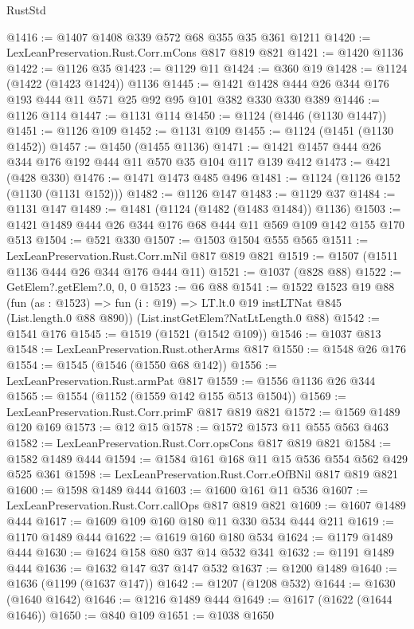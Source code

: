 \begin{lexlean}{RustStd}
\begin{coremodule}
@1416 := @1407 @1408 @339 @572 @68 @355 @35 @361 @1211
@1420 := LexLeanPreservation.Rust.Corr.mCons @817 @819 @821
@1421 := @1420 @1136
@1422 := @1126 @35
@1423 := @1129 @11
@1424 := @360 @19
@1428 := @1124 (@1422 (@1423 @1424)) @1136
@1445 := @1421 @1428 @444 @26 @344 @176 @193 @444 @11 @571 @25 @92 @95 @101 @382 @330 @330 @389
@1446 := @1126 @114
@1447 := @1131 @114
@1450 := @1124 (@1446 (@1130 @1447))
@1451 := @1126 @109
@1452 := @1131 @109
@1455 := @1124 (@1451 (@1130 @1452))
@1457 := @1450 (@1455 @1136)
@1471 := @1421 @1457 @444 @26 @344 @176 @192 @444 @11 @570 @35 @104 @117 @139 @412
@1473 := @421 (@428 @330)
@1476 := @1471 @1473 @485 @496
@1481 := @1124 (@1126 @152 (@1130 (@1131 @152)))
@1482 := @1126 @147
@1483 := @1129 @37
@1484 := @1131 @147
@1489 := @1481 (@1124 (@1482 (@1483 @1484)) @1136)
@1503 := @1421 @1489 @444 @26 @344 @176 @68 @444 @11 @569 @109 @142 @155 @170 @513
@1504 := @521 @330
@1507 := @1503 @1504 @555 @565
@1511 := LexLeanPreservation.Rust.Corr.mNil @817 @819 @821
@1519 := @1507 (@1511 @1136 @444 @26 @344 @176 @444 @11)
@1521 := @1037 (@828 @88)
@1522 := GetElem?.getElem?.{0, 0, 0}
@1523 := @6 @88
@1541 := @1522
    @1523
    @19
    @88
    (fun (as : @1523) => fun (i : @19) => LT.lt.{0} @19 instLTNat @845 (List.length.{0} @88 @890))
    (List.instGetElem?NatLtLength.{0} @88)
@1542 := @1541 @176
@1545 := @1519 (@1521 (@1542 @109))
@1546 := @1037 @813
@1548 := LexLeanPreservation.Rust.otherArms @817
@1550 := @1548 @26 @176
@1554 := @1545 (@1546 (@1550 @68 @142))
@1556 := LexLeanPreservation.Rust.armPat @817
@1559 := @1556 @1136 @26 @344
@1565 := @1554 (@1152 (@1559 @142 @155 @513 @1504))
@1569 := LexLeanPreservation.Rust.Corr.primF @817 @819 @821
@1572 := @1569 @1489 @120 @169
@1573 := @12 @15
@1578 := @1572 @1573 @11 @555 @563 @463
@1582 := LexLeanPreservation.Rust.Corr.opsCons @817 @819 @821
@1584 := @1582 @1489 @444
@1594 := @1584 @161 @168 @11 @15 @536 @554 @562 @429 @525 @361
@1598 := LexLeanPreservation.Rust.Corr.eOfBNil @817 @819 @821
@1600 := @1598 @1489 @444
@1603 := @1600 @161 @11 @536
@1607 := LexLeanPreservation.Rust.Corr.callOps @817 @819 @821
@1609 := @1607 @1489 @444
@1617 := @1609 @109 @160 @180 @11 @330 @534 @444 @211
@1619 := @1170 @1489 @444
@1622 := @1619 @160 @180 @534
@1624 := @1179 @1489 @444
@1630 := @1624 @158 @80 @37 @14 @532 @341
@1632 := @1191 @1489 @444
@1636 := @1632 @147 @37 @147 @532
@1637 := @1200 @1489
@1640 := @1636 (@1199 (@1637 @147))
@1642 := @1207 (@1208 @532)
@1644 := @1630 (@1640 @1642)
@1646 := @1216 @1489 @444
@1649 := @1617 (@1622 (@1644 @1646))
@1650 := @840 @109
@1651 := @1038 @1650

\end{coremodule}
\end{lexlean}
